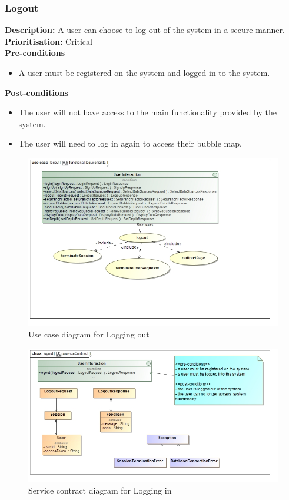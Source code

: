\documentclass[hidelinks,english]{article}
\begin{document}
    		\subsubsection{Logout}
				\textbf{Description:}  A user can choose to log out of the system in a secure manner.\\
    			\textbf{Prioritisation:} Critical\\
      			\textbf{Pre-conditions}
    			\begin{itemize}
        			\item A user must be registered on the system and logged in to the system.
    			\end{itemize}
    			\textbf{Post-conditions}
     			\begin{itemize}
        			\item The user will not have access to the main functionality provided by the system.
        			\item The user will need to log in again to access their bubble map.
    			\end{itemize}

    		\begin{figure}[!h]
    			\includegraphics[width=\linewidth]{functionalRequirementsLogout.jpg}
    			\caption{Use case diagram for Logging out}
    			\label{UseCaseLogout}
    			\end{figure}
    			
    			\begin{figure}[!h]
    			\includegraphics[width=\linewidth]{serviceContractLogout.jpg}
    			\caption{Service contract diagram for Logging in}
    			\label{ServiceContractLogout}
    			\end{figure}
    			
\end{document}
